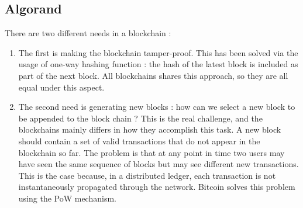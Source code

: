 \subsection{Algorand}
There are two different needs in a blockchain :
\begin{enumerate}
\item The first is making the blockchain tamper-proof. This has been solved via the usage of one-way hashing function : the hash of the latest block is included as part of the next block. All blockchains shares this approach, so they are all equal under this aspect.
\item The second need is generating new blocks : how can we select a new block to be appended to the block chain ? This is the real challenge, and the blockchains mainly differs in how they accomplish this task. A new block should contain a set of valid transactions that do not appear in the blockchain so far. The problem is that at any point in time two users may have seen the same sequence of blocks but may see different new transactions. This is the case because, in a distributed ledger, each transaction is not instantaneously propagated through the network. Bitcoin solves this problem using the PoW mechanism.
\end{enumerate}
